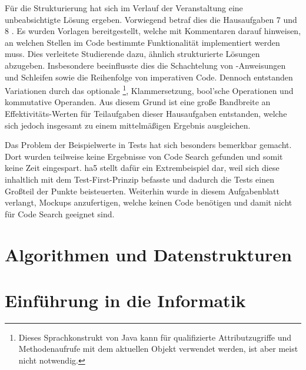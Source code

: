 Für die Strukturierung hat sich im Verlauf der Veranstaltung eine unbeabsichtigte Lösung ergeben.
Vorwiegend betraf dies die Hausaufgaben 7 und 8 .
Es wurden Vorlagen bereitgestellt, welche mit Kommentaren darauf hinweisen, an welchen Stellen im Code bestimmte Funktionalität implementiert werden muss.
Dies verleitete Studierende dazu, ähnlich strukturierte Lösungen abzugeben.
Insbesondere beeinflusste dies die Schachtelung von -Anweisungen und Schleifen sowie die Reihenfolge von imperativen Code.
Dennoch entstanden Variationen durch das optionale \footnote{
    Dieses Sprachkonstrukt von Java kann für qualifizierte Attributzugriffe und Methodenaufrufe mit dem aktuellen Objekt verwendet werden, ist aber meist nicht notwendig.
}, Klammersetzung, bool'sche Operationen und kommutative Operanden.
Aus diesem Grund ist eine große Bandbreite an Effektivitäts-Werten für Teilaufgaben dieser Hausaufgaben entstanden, welche sich jedoch insgesamt zu einem mittelmäßigen Ergebnis ausgleichen.

Das Problem der Beispielwerte in Tests hat sich besonders bemerkbar gemacht.
Dort wurden teilweise keine Ergebnisse von Code Search gefunden und somit keine Zeit eingespart.
\ac{ha}5 stellt dafür ein Extrembeispiel dar, weil sich diese inhaltlich mit dem Test-First-Prinzip befasste und dadurch die Tests einen Großteil der Punkte beisteuerten.
Weiterhin wurde in diesem Aufgabenblatt verlangt, Mockups anzufertigen, welche keinen Code benötigen und damit nicht für Code Search geeignet sind.

\section{Algorithmen und Datenstrukturen}\label{sec:algods-2021}


\section{Einführung in die Informatik}\label{sec:einfinf-2021-2022}

